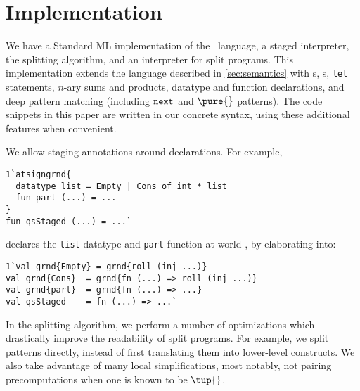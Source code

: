 
\section {Implementation}
\label{sec:implementation}

\begin{abstrsyn}
We have a Standard ML implementation of the \lang\ language, a staged
interpreter, the splitting algorithm, and an interpreter for split programs.
This implementation extends the language described in \ref{sec:semantics} with 
\rmint{}s,
\rmbool{}s,
\texttt{let} statements,
$n$-ary sums and products,
datatype and function declarations, and
deep pattern matching (including ${\tt next}{}$ and $\pure{}$ patterns).
The code snippets in this paper are written in our concrete syntax, using 
these additional features when convenient.

We allow staging annotations around declarations. For example,
\begin{lstlisting}
1`atsigngrnd{
  datatype list = Empty | Cons of int * list
  fun part (...) = ...
}
fun qsStaged (...) = ...`
\end{lstlisting}
declares the \texttt{list} datatype and \texttt{part} function at world \bbonep,
by elaborating into:
\begin{lstlisting}
1`val grnd{Empty} = grnd{roll (inj ...)}
val grnd{Cons}  = grnd{fn (...) => roll (inj ...)}
val grnd{part}  = grnd{fn (...) => ...}
val qsStaged    = fn (...) => ...`
\end{lstlisting}

In the splitting algorithm, we perform a number of optimizations which
drastically improve the readability of split programs. For example, we split
patterns directly, instead of first translating them into lower-level
constructs. We also take advantage of many local simplifications, most notably,
not pairing precomputations when one is known to be $\tup{}$.




\end{abstrsyn}
